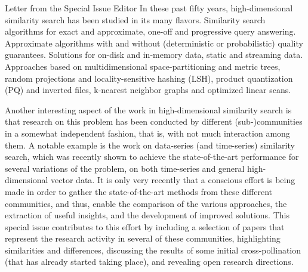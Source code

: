 \documentclass[11pt]{article}
\begin{document}
\begin{bulletin}
\begin{lettersection}
\begin{letter}{Letter from the Special Issue Editor}
In these past fifty years, high-dimensional similarity search has been studied in its many flavors. Similarity search algorithms for exact and approximate, one-off and progressive query answering. 
Approximate algorithms with and without (deterministic or probabilistic) quality guarantees.
Solutions for on-disk and in-memory data, static and streaming data.
Approaches based on multidimensional space-partitioning and metric trees, random projections and locality-sensitive hashing (LSH), product quantization (PQ) and inverted files, k-nearest neighbor graphs and optimized linear scans.

Another interesting aspect of the work in high-dimensional similarity search is that research on this problem has been conducted by different (sub-)communities in a somewhat independent fashion, that is, with not much interaction among them.
A notable example is the work on data-series (and time-series) similarity search, which was recently shown to achieve the state-of-the-art performance for several variations of the problem, on both time-series and general high-dimensional vector data.
It is only very recently that a conscious effort is being made in order to gather the state-of-the-art methods from these different communities, and thus, enable the comparison of the various approaches, the extraction of useful insights, and the development of improved solutions.
This special issue contributes to this effort by including a selection of papers that represent the research activity in several of these communities, highlighting similarities and differences, discussing the results of some initial cross-pollination (that has already started taking place), and revealing open research directions.


\end{letter}
\end{lettersection}
\end{bulletin}
\end{document}

